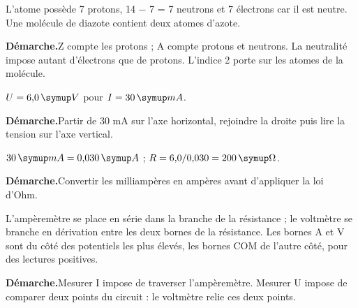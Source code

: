 \par\noindent\begin{minipage}{\linewidth}L’atome possède 7 protons, 14 − 7 = 7 neutrons et 7 électrons car il est neutre. Une molécule de diazote contient deux atomes d’azote.\par\smallskip\textbf{Démarche.}\enspace Z compte les protons ; A compte protons et neutrons. La neutralité impose autant d’électrons que de protons. L’indice 2 porte sur les atomes de la molécule.\par{}\end{minipage}\par
{}
\par\noindent\begin{minipage}{\linewidth}$U=6{,}0\unite V$ pour $I=30\unite{mA}$.\par\smallskip\textbf{Démarche.}\enspace Partir de 30 mA sur l’axe horizontal, rejoindre la droite puis lire la tension sur l’axe vertical.\par{}\end{minipage}\par
\par\noindent\begin{minipage}{\linewidth}$30\unite{mA}=0{,}030\unite A$ ; $R=6{,}0/0{,}030=200\unite\Omega$.\par\smallskip\textbf{Démarche.}\enspace Convertir les milliampères en ampères avant d’appliquer la loi d’Ohm.\par{}\end{minipage}\par
\par\noindent\begin{minipage}{\linewidth}L’ampèremètre se place en série dans la branche de la résistance ; le voltmètre se branche en dérivation entre les deux bornes de la résistance. Les bornes A et V sont du côté des potentiels les plus élevés, les bornes COM de l’autre côté, pour des lectures positives.\par\smallskip\textbf{Démarche.}\enspace Mesurer I impose de traverser l’ampèremètre. Mesurer U impose de comparer deux points du circuit : le voltmètre relie ces deux points.\par{}\end{minipage}\par
